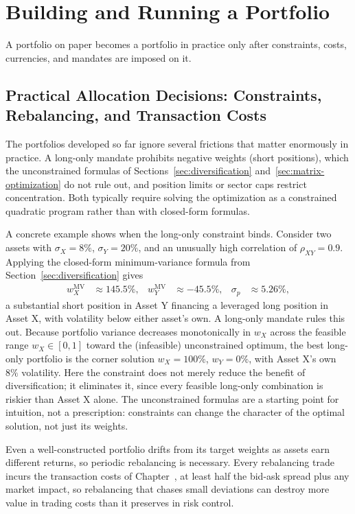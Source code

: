 \documentclass[../ai_in_finance]{subfiles}
\begin{document}
\section{Building and Running a Portfolio}

A portfolio on paper becomes a portfolio in practice only after constraints, costs, currencies, and mandates are imposed on it.

\subsection{Practical Allocation Decisions: Constraints, Rebalancing, and Transaction Costs}
\label{sec:practical-allocation}

The portfolios developed so far ignore several frictions that matter enormously in practice. A long-only mandate prohibits negative weights (short positions), which the unconstrained formulas of Sections~\ref{sec:diversification} and~\ref{sec:matrix-optimization} do not rule out, and position limits or sector caps restrict concentration. Both typically require solving the optimization as a constrained quadratic program rather than with closed-form formulas.

A concrete example shows when the long-only constraint binds. Consider two assets with $\sigma_X=8\%$, $\sigma_Y=20\%$, and an unusually high correlation of $\rho_{XY}=0.9$. Applying the closed-form minimum-variance formula from Section~\ref{sec:diversification} gives
\begin{align*}
w_X^{\text{MV}} &\approx 145.5\%, & w_Y^{\text{MV}} &\approx -45.5\%, & \sigma_p &\approx 5.26\%,
\end{align*}
a substantial short position in Asset Y financing a leveraged long position in Asset X, with volatility below either asset's own. A long-only mandate rules this out. Because portfolio variance decreases monotonically in $w_X$ across the feasible range $w_X \in [0,1]$ toward the (infeasible) unconstrained optimum, the best long-only portfolio is the corner solution $w_X=100\%$, $w_Y=0\%$, with Asset X's own $8\%$ volatility.
Here the constraint does not merely reduce the benefit of diversification; it eliminates it, since every feasible long-only combination is riskier than Asset X alone. The unconstrained formulas are a starting point for intuition, not a prescription: constraints can change the character of the optimal solution, not just its weights.

Even a well-constructed portfolio drifts from its target weights as assets earn different returns, so periodic rebalancing is necessary. Every rebalancing trade incurs the transaction costs of Chapter~, at least half the bid-ask spread plus any market impact, so rebalancing that chases small deviations can destroy more value in trading costs than it preserves in risk control.
\end{document}
